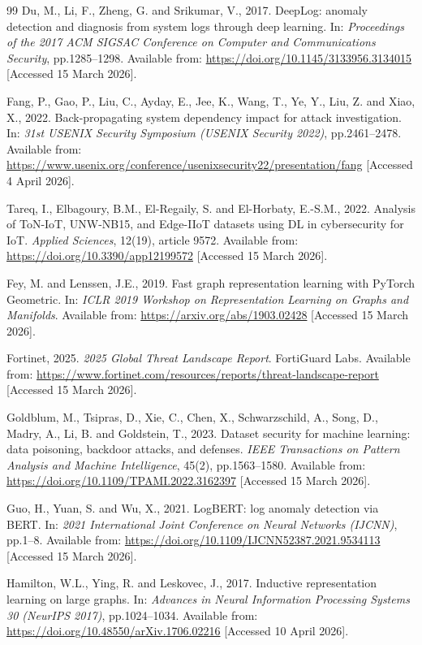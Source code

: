\documentclass[12pt,a4paper]{report}
\begin{document}
\begin{thebibliography}{99}
Du, M., Li, F., Zheng, G. and Srikumar, V., 2017. DeepLog: anomaly detection and diagnosis from system logs through deep learning. In: \textit{Proceedings of the 2017 ACM SIGSAC Conference on Computer and Communications Security}, pp.1285--1298. Available from: \url{https://doi.org/10.1145/3133956.3134015} [Accessed 15 March 2026].

Fang, P., Gao, P., Liu, C., Ayday, E., Jee, K., Wang, T., Ye, Y., Liu, Z. and Xiao, X., 2022. Back-propagating system dependency impact for attack investigation. In: \textit{31st USENIX Security Symposium (USENIX Security 2022)}, pp.2461--2478. Available from: \url{https://www.usenix.org/conference/usenixsecurity22/presentation/fang} [Accessed 4 April 2026].

Tareq, I., Elbagoury, B.M., El-Regaily, S. and El-Horbaty, E.-S.M., 2022. Analysis of ToN-IoT, UNW-NB15, and Edge-IIoT datasets using DL in cybersecurity for IoT. \textit{Applied Sciences}, 12(19), article 9572. Available from: \url{https://doi.org/10.3390/app12199572} [Accessed 15 March 2026].

Fey, M. and Lenssen, J.E., 2019. Fast graph representation learning with PyTorch Geometric. In: \textit{ICLR 2019 Workshop on Representation Learning on Graphs and Manifolds}. Available from: \url{https://arxiv.org/abs/1903.02428} [Accessed 15 March 2026].

Fortinet, 2025. \textit{2025 Global Threat Landscape Report}. FortiGuard Labs. Available from: \url{https://www.fortinet.com/resources/reports/threat-landscape-report} [Accessed 15 March 2026].

Goldblum, M., Tsipras, D., Xie, C., Chen, X., Schwarzschild, A., Song, D., Madry, A., Li, B. and Goldstein, T., 2023. Dataset security for machine learning: data poisoning, backdoor attacks, and defenses. \textit{IEEE Transactions on Pattern Analysis and Machine Intelligence}, 45(2), pp.1563--1580. Available from: \url{https://doi.org/10.1109/TPAMI.2022.3162397} [Accessed 15 March 2026].

Guo, H., Yuan, S. and Wu, X., 2021. LogBERT: log anomaly detection via BERT. In: \textit{2021 International Joint Conference on Neural Networks (IJCNN)}, pp.1--8. Available from: \url{https://doi.org/10.1109/IJCNN52387.2021.9534113} [Accessed 15 March 2026].

Hamilton, W.L., Ying, R. and Leskovec, J., 2017. Inductive representation learning on large graphs. In: \textit{Advances in Neural Information Processing Systems 30 (NeurIPS 2017)}, pp.1024--1034. Available from: \url{https://doi.org/10.48550/arXiv.1706.02216} [Accessed 10 April 2026].


\end{thebibliography}
\end{document}

